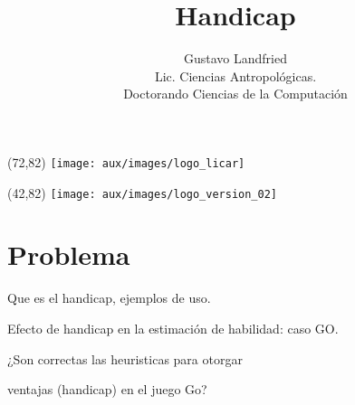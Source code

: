 \documentclass[shownotes]{beamer}
\title[Handicap]{Handicap}
\author[Gustavo Landfried]{Gustavo Landfried \\ \vspace{0.2cm}
\scriptsize Lic. Ciencias Antropol\'ogicas. \\
Doctorando Ciencias de la Computaci\'on \\
\vspace{-0.3cm}}
\institute[DC-ICC-CONICET]{Departamento de Ciencias de la Computaci\'on (UBA -- CONICET) \vspace{-0.3cm}}
\date{}
\begin{document}
\small 

\begin{frame}[noframenumbering]

\maketitle

 \begin{textblock}{80}(72,82)
 \texttt{[image: aux/images/logo\_licar]} 
 \end{textblock}
  \begin{textblock}{80}(42,82)
 \texttt{[image: aux/images/logo\_version\_02]} 
\end{textblock}

\end{frame}

\section{Problema}

\begin{frame}
  Que es el handicap, ejemplos de uso.
\end{frame}


\begin{frame}
 
 \begin{framed} \centering
  Efecto de handicap en la estimaci\'on de habilidad: caso GO.
 \end{framed}
 
\end{frame}

\begin{frame}
 \begin{framed} \centering
  ¿Son correctas las heuristicas para otorgar 
  
  ventajas (handicap) en el juego Go?
 \end{framed}
 
\end{frame}
\end{document}
